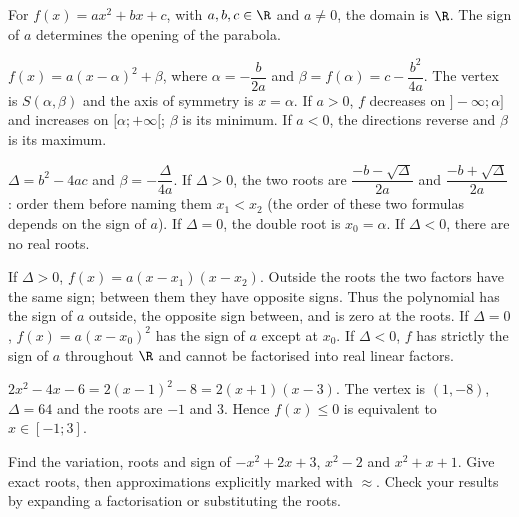
\begin{definition}
For $f(x)=ax^2+bx+c$, with $a,b,c\in\R$ and $a\neq0$, the domain is $\R$. The sign of $a$ determines the opening of the parabola.
\end{definition}

\begin{theorem}
$f(x)=a(x-\alpha)^2+\beta$, where $\alpha=-\dfrac{b}{2a}$ and $\beta=f(\alpha)=c-\dfrac{b^2}{4a}$. The vertex is $S(\alpha,\beta)$ and the axis of symmetry is $x=\alpha$. If $a>0$, $f$ decreases on $]-\infty;\alpha]$ and increases on $[\alpha;+\infty[$; $\beta$ is its minimum. If $a<0$, the directions reverse and $\beta$ is its maximum.
\end{theorem}

\begin{theorem}
$\Delta=b^2-4ac$ and $\beta=-\dfrac{\Delta}{4a}$. If $\Delta>0$, the two roots are $\dfrac{-b-\sqrt\Delta}{2a}$ and $\dfrac{-b+\sqrt\Delta}{2a}$: order them before naming them $x_1<x_2$ (the order of these two formulas depends on the sign of $a$). If $\Delta=0$, the double root is $x_0=\alpha$. If $\Delta<0$, there are no real roots.
\end{theorem}

\begin{keypoint}
If $\Delta>0$, $f(x)=a(x-x_1)(x-x_2)$. Outside the roots the two factors have the same sign; between them they have opposite signs. Thus the polynomial has the sign of $a$ outside, the opposite sign between, and is zero at the roots. If $\Delta=0$, $f(x)=a(x-x_0)^2$ has the sign of $a$ except at $x_0$. If $\Delta<0$, $f$ has strictly the sign of $a$ throughout $\R$ and cannot be factorised into real linear factors.
\end{keypoint}

\begin{example}
$2x^2-4x-6=2(x-1)^2-8=2(x+1)(x-3)$. The vertex is $(1,-8)$, $\Delta=64$ and the roots are $-1$ and $3$. Hence $f(x)\leq0$ is equivalent to $x\in[-1;3]$.
\end{example}

\begin{figurebox}
\end{figurebox}

\begin{activity}
Find the variation, roots and sign of $-x^2+2x+3$, $x^2-2$ and $x^2+x+1$. Give exact roots, then approximations explicitly marked with $\approx$. Check your results by expanding a factorisation or substituting the roots.
\end{activity}
